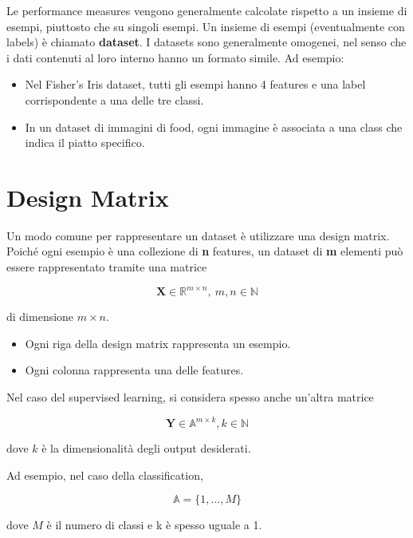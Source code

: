 Le performance measures vengono generalmente calcolate rispetto a un insieme di esempi, piuttosto che su singoli esempi. Un insieme di esempi (eventualmente con labels) è chiamato \textbf{dataset}. I datasets sono generalmente omogenei, nel senso che i dati contenuti al loro interno hanno un formato simile. Ad esempio:

\begin{itemize}
    \item Nel Fisher’s Iris dataset, tutti gli esempi hanno 4 features e una label corrispondente a una delle tre classi.
    \item In un dataset di immagini di food, ogni immagine è associata a una class che indica il piatto specifico.
\end{itemize}

\section{Design Matrix}

Un modo comune per rappresentare un dataset è utilizzare una design matrix. Poiché ogni esempio è una collezione di \textbf{n} features, un dataset di \textbf{m} elementi può essere rappresentato tramite una matrice

$$ \mathbf{X} \in \mathbb{R}^{m \times n}, \ m, n \in \mathbb{N}$$

\noindent
di dimensione $m \times n$.

\begin{itemize}
    \item Ogni riga della design matrix rappresenta un esempio.
    \item Ogni colonna rappresenta una delle features.
\end{itemize}

\noindent
Nel caso del supervised learning, si considera spesso anche un'altra matrice

$$ \mathbf{Y} \in \mathbb{A}^{m \times k}, k \in \mathbb{N}$$

\noindent
dove \( k \) è la dimensionalità degli output desiderati.

\noindent
Ad esempio, nel caso della classification,

\[ \mathbb{A} = \{1, \ldots, M\} \]

\noindent
dove \( M \) è il numero di classi e k è spesso uguale a 1.

